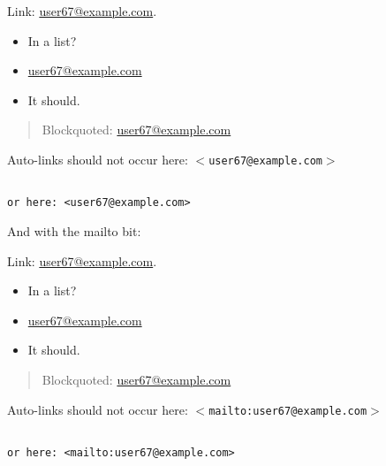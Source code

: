 
\def\mytitle{Email Test  }

Link: \href{mailto:user67@example.com}{user67@example.com}.

\begin{itemize}
\item In a list?

\item \href{mailto:user67@example.com}{user67@example.com}

\item It should.

\end{itemize}

\begin{quote}
Blockquoted: \href{mailto:user67@example.com}{user67@example.com}
\end{quote}

Auto-links should not occur here: \texttt{$<$user67@example.com$>$}

\begin{verbatim}

or here: <user67@example.com>

\end{verbatim}


And with the mailto bit:

Link: \href{mailto:user67@example.com}{user67@example.com}.

\begin{itemize}
\item In a list?

\item \href{mailto:user67@example.com}{user67@example.com}

\item It should.

\end{itemize}

\begin{quote}
Blockquoted: \href{mailto:user67@example.com}{user67@example.com}
\end{quote}

Auto-links should not occur here: \texttt{$<$mailto:user67@example.com$>$}

\begin{verbatim}

or here: <mailto:user67@example.com>

\end{verbatim}





